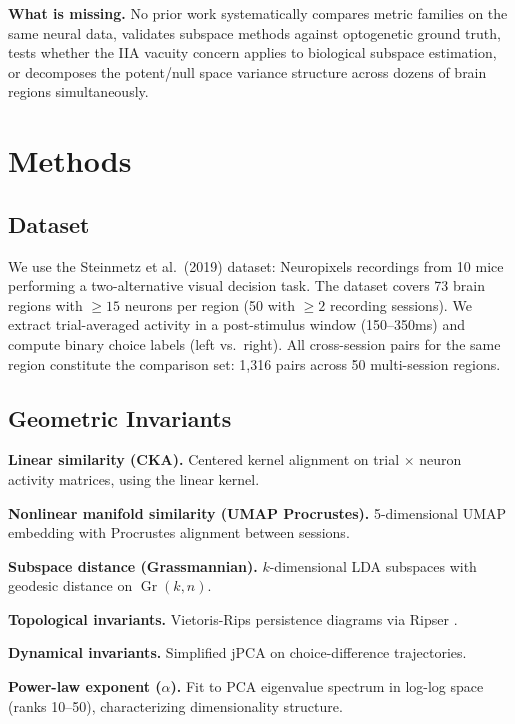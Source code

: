 \documentclass{article}
\begin{document}
\textbf{What is missing.} No prior work systematically compares metric families on the same neural data, validates subspace methods against optogenetic ground truth, tests whether the IIA vacuity concern applies to biological subspace estimation, or decomposes the potent/null space variance structure across dozens of brain regions simultaneously.

\section{Methods}

\subsection{Dataset}

We use the Steinmetz et al.\ (2019) dataset: Neuropixels recordings from 10 mice performing a two-alternative visual decision task. The dataset covers 73 brain regions with $\geq 15$ neurons per region (50 with $\geq 2$ recording sessions). We extract trial-averaged activity in a post-stimulus window (150--350ms) and compute binary choice labels (left vs.\ right). All cross-session pairs for the same region constitute the comparison set: 1,316 pairs across 50 multi-session regions.

\subsection{Geometric Invariants}

\textbf{Linear similarity (CKA).} Centered kernel alignment \citep{kornblith2019similarity} on trial $\times$ neuron activity matrices, using the linear kernel.

\textbf{Nonlinear manifold similarity (UMAP Procrustes).} 5-dimensional UMAP embedding \citep{mcinnes2018umap} with Procrustes alignment between sessions.

\textbf{Subspace distance (Grassmannian).} $k$-dimensional LDA subspaces with geodesic distance on $\operatorname{Gr}(k, n)$.

\textbf{Topological invariants.} Vietoris-Rips persistence diagrams via Ripser \citep{bauer2021ripser}.

\textbf{Dynamical invariants.} Simplified jPCA on choice-difference trajectories.

\textbf{Power-law exponent ($\alpha$).} Fit to PCA eigenvalue spectrum in log-log space (ranks 10--50), characterizing dimensionality structure.
\end{document}
